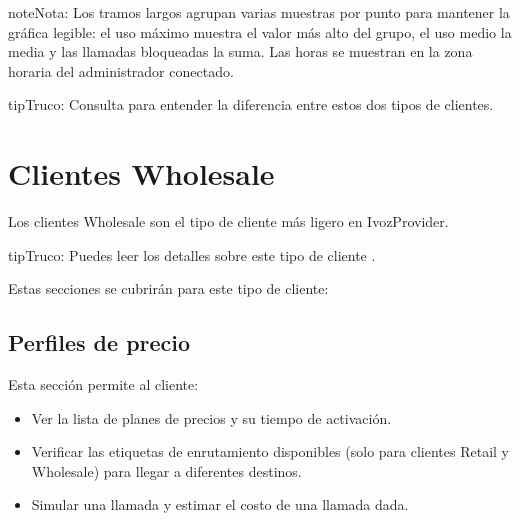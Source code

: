 \documentclass[letterpaper,10pt,spanish]{sphinxmanual}
\begin{document}
\begin{notice}{note}{Nota:}
Los tramos largos agrupan varias muestras por punto para mantener la gráfica legible: el uso máximo muestra el valor más alto del grupo, el uso medio la media y las llamadas bloqueadas la suma. Las horas se muestran en la zona horaria del administrador conectado.
\end{notice}

\begin{notice}{tip}{Truco:}
Consulta {\hyperref[administration_portal/brand/clients/retail:differences\string-between\string-retail\string-and\string-residential\string-clients]{}} para entender la diferencia entre estos dos tipos de clientes.
\end{notice}
\label{administration_portal/client/wholesale/index:wholesale-clients}

\section{Clientes Wholesale}
\label{administration_portal/client/wholesale/index:clientes-wholesale}\label{administration_portal/client/wholesale/index:wholesale-clients}\label{administration_portal/client/wholesale/index::doc}\label{administration_portal/client/wholesale/index:id1}
Los clientes Wholesale son el tipo de cliente más ligero en IvozProvider.

\begin{notice}{tip}{Truco:}
Puedes leer los detalles sobre este tipo de cliente {\hyperref[administration_portal/brand/clients/wholesale:wholesale\string-clients]{}}.
\end{notice}

Estas secciones se cubrirán para este tipo de cliente:


\subsection{Perfiles de precio}
\label{administration_portal/client/wholesale/rating_profiles:rating-profiles}\label{administration_portal/client/wholesale/rating_profiles::doc}
Esta sección permite al cliente:
\begin{itemize}
\item {} 
Ver la lista de planes de precios y su tiempo de activación.

\item {} 
Verificar las etiquetas de enrutamiento disponibles (solo para clientes Retail y Wholesale) para llegar a diferentes destinos.

\item {} 
Simular una llamada y estimar el costo de una llamada dada.

\end{itemize}
\end{document}
